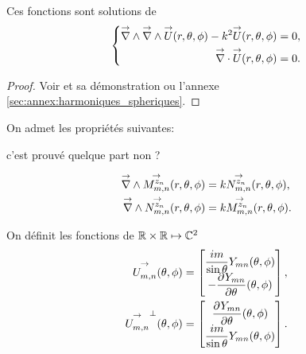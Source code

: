     \begin{prop}
        Ces fonctions sont solutions de 
        \begin{equation*}
            \left\lbrace
                \begin{aligned}
                    \vrot \vrot \vect{U}(\rtp) - k^2 \vect{U}(\rtp) &= 0,
                    \\
                    \vdiv \vect{U}(\rtp) &= 0.
                \end{aligned}
            \right.
        \end{equation*}
    \end{prop}
    \begin{proof}
        Voir \cite[Théorème.~5.3.1]{nedelec_acoustic_2001} et sa démonstration ou l'annexe \ref{sec:annex:harmoniques_spheriques}.
    \end{proof}

    On admet les propriétés suivantes:
\begin{REM}
  c'est prouvé quelque part non ?
\end{REM} 
    \begin{prop}
        \label{prop:Mmn_Nmn_rot}
        \begin{align*}
            \vrot \Mmn[z_n](\rtp) &= k\Nmn[z_n](\rtp),
            \\
            \vrot \Nmn[z_n](\rtp) &= k\Mmn[z_n](\rtp).
        \end{align*}
    \end{prop}



    \begin{defn}
        On définit les fonctions de \(\RR\times\RR\mapsto \CC^2\)
        \begin{align}
            \label{eq:defUmn_tgt}
            \Umn(\tp) &=
            \begin{bmatrix}
                \frac{im}{\sin\theta}Y_{mn}(\tp)
                \\
                - \ddr{\theta}{Y_{mn}}(\tp)
            \end{bmatrix},
            \\
            \label{eq:defNmn_tgt}
            \Umn^\perp(\tp) &=
            \begin{bmatrix}
                \ddr{\theta}{Y_{mn}}(\tp)
                \\
                \frac{im}{\sin\theta}Y_{mn}(\tp)
            \end{bmatrix}.
        \end{align}
    \end{defn}

